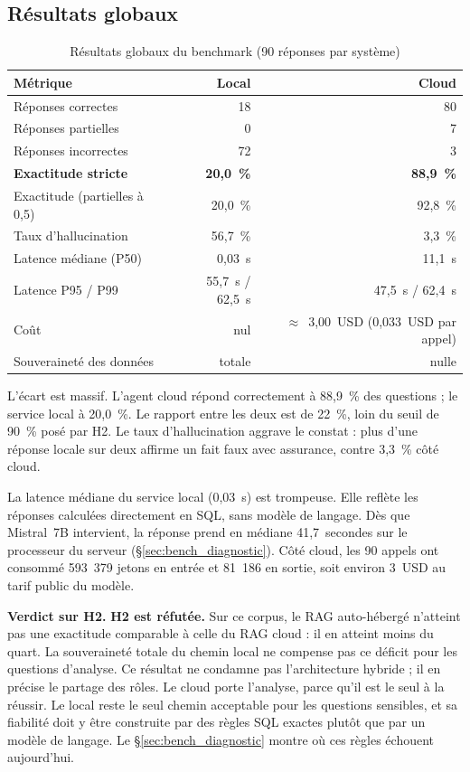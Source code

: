 \subsection{Résultats globaux}
\label{sec:bench_resultats_globaux}

\begin{table}[htbp]
\centering
\footnotesize
\caption{Résultats globaux du benchmark (90 réponses par système)}
\label{tab:bench_resultats_globaux}
\begin{tabular}{|l|r|r|}
\hline
\rowcolor[HTML]{EFEFEF}
\textbf{Métrique} & \textbf{Local} & \textbf{Cloud} \\ \hline
Réponses correctes & 18 & 80 \\ \hline
Réponses partielles & 0 & 7 \\ \hline
Réponses incorrectes & 72 & 3 \\ \hline
\textbf{Exactitude stricte} & \textbf{20,0~\%} & \textbf{88,9~\%} \\ \hline
Exactitude (partielles à 0,5) & 20,0~\% & 92,8~\% \\ \hline
Taux d'hallucination & 56,7~\% & 3,3~\% \\ \hline
Latence médiane (P50) & 0,03~s & 11,1~s \\ \hline
Latence P95 / P99 & 55,7~s / 62,5~s & 47,5~s / 62,4~s \\ \hline
Coût & nul & $\approx$~3,00~USD (0,033~USD par appel) \\ \hline
Souveraineté des données & totale & nulle \\ \hline
\end{tabular}
\end{table}

L'écart est massif. L'agent cloud répond correctement à 88,9~\% des questions ; le service local à 20,0~\%. Le rapport entre les deux est de 22~\%, loin du seuil de 90~\% posé par H2. Le taux d'hallucination aggrave le constat : plus d'une réponse locale sur deux affirme un fait faux avec assurance, contre 3,3~\% côté cloud.

La latence médiane du service local (0,03~s) est trompeuse. Elle reflète les réponses calculées directement en SQL, sans modèle de langage. Dès que Mistral~7B intervient, la réponse prend en médiane 41,7~secondes sur le processeur du serveur (§\ref{sec:bench_diagnostic}). Côté cloud, les 90 appels ont consommé 593~379 jetons en entrée et 81~186 en sortie, soit environ 3~USD au tarif public du modèle.

\textbf{Verdict sur H2.} \textbf{H2 est réfutée.} Sur ce corpus, le RAG auto-hébergé n'atteint pas une exactitude comparable à celle du RAG cloud : il en atteint moins du quart. La souveraineté totale du chemin local ne compense pas ce déficit pour les questions d'analyse. Ce résultat ne condamne pas l'architecture hybride ; il en précise le partage des rôles. Le cloud porte l'analyse, parce qu'il est le seul à la réussir. Le local reste le seul chemin acceptable pour les questions sensibles, et sa fiabilité doit y être construite par des règles SQL exactes plutôt que par un modèle de langage. Le §\ref{sec:bench_diagnostic} montre où ces règles échouent aujourd'hui.

